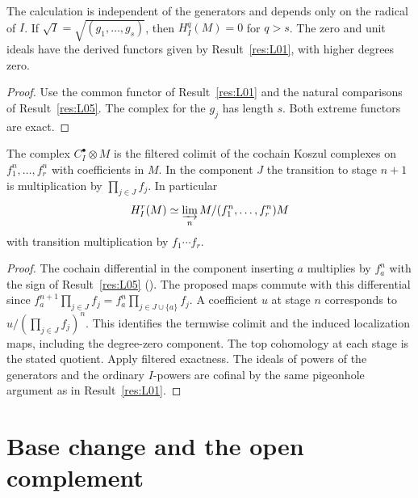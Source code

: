 \begin{corollary}\label{res:L06}
The calculation is independent of the generators and depends only on
the radical of \(I\). If \(\sqrt I=\sqrt{(g_1,\ldots,g_s)}\), then
\(H_I^q(M)=0\) for \(q>s\). The zero and unit ideals have the derived
functors given by Result~\ref{res:L01}, with higher degrees zero.
\end{corollary}
\begin{proof}
Use the common functor of Result~\ref{res:L01} and the natural
comparisons of Result~\ref{res:L05}. The complex for the \(g_j\) has
length \(s\). Both extreme functors are exact.
\end{proof}

\begin{proposition}\label{res:L07}
The complex \(C_I^\bullet\otimes M\) is the filtered colimit of the
cochain Koszul complexes on \(f_1^n,\ldots,f_r^n\) with coefficients in
\(M\). In the component \(J\) the transition to stage \(n+1\) is
multiplication by \(\prod_{j\in J}f_j\). In particular
\[
 H_I^r(M)\simeq
 \varinjlim_n M/(f_1^n,\ldots,f_r^n)M
\]
with transition multiplication by \(f_1\cdots f_r\).
\end{proposition}
\begin{proof}
The cochain differential in the component inserting \(a\) multiplies
by \(f_a^n\) with the sign of Result~\ref{res:L05}
(\cite[RK-03 and RK-10]{core}). The proposed maps commute with this
differential since \(f_a^{n+1}\prod_{j\in J}f_j
=f_a^n\prod_{j\in J\cup\{a\}}f_j\). A coefficient \(u\) at stage \(n\)
corresponds to \(u/(\prod_{j\in J}f_j)^n\). This identifies the
termwise colimit and the induced localization maps, including the
degree-zero component. The top cohomology at each stage is the stated
quotient. Apply filtered exactness. The ideals of powers of the
generators and the ordinary \(I\)-powers are cofinal by the same
pigeonhole argument as in Result~\ref{res:L01}.
\end{proof}

\section{Base change and the open complement}

